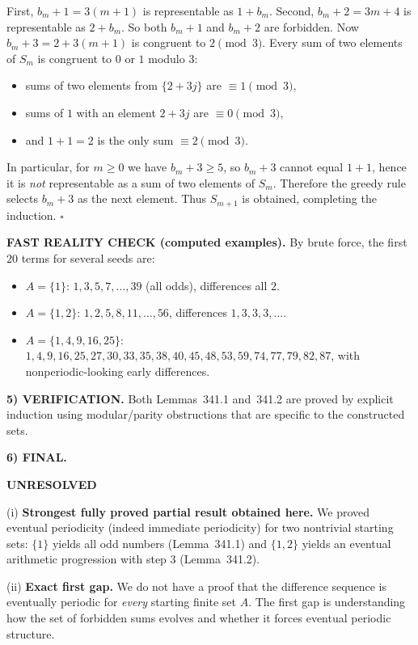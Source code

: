 First, $b_m+1=3(m+1)$ is representable as $1+b_m$.
Second, $b_m+2=3m+4$ is representable as $2+b_m$.
So both $b_m+1$ and $b_m+2$ are forbidden.
Now $b_m+3=2+3(m+1)$ is congruent to $2\pmod 3$.
Every sum of two elements of $S_m$ is congruent to $0$ or $1$ modulo $3$:
\begin{itemize}
\item sums of two elements from $\{2+3j\}$ are $\equiv 1\pmod 3$,
\item sums of $1$ with an element $2+3j$ are $\equiv 0\pmod 3$,
\item and $1+1=2$ is the only sum $\equiv 2\pmod 3$.
\end{itemize}
In particular, for $m\ge 0$ we have $b_m+3\ge 5$, so $b_m+3$ cannot equal $1+1$, hence it is \emph{not} representable as a sum of two elements of $S_m$.
Therefore the greedy rule selects $b_m+3$ as the next element.
Thus $S_{m+1}$ is obtained, completing the induction.
\hfill$\square$

\medskip
\noindent\textbf{FAST REALITY CHECK (computed examples).}
By brute force, the first $20$ terms for several seeds are:
\begin{itemize}
\item $A=\{1\}$: $1,3,5,7,\dots,39$ (all odds), differences all $2$.
\item $A=\{1,2\}$: $1,2,5,8,11,\dots,56$, differences $1,3,3,3,\dots$.
\item $A=\{1,4,9,16,25\}$: $1,4,9,16,25,27,30,33,35,38,40,45,48,53,59,74,77,79,82,87$, with nonperiodic-looking early differences.
\end{itemize}

\medskip
\noindent\textbf{5) VERIFICATION.}
Both Lemmas~341.1 and~341.2 are proved by explicit induction using modular/parity obstructions that are specific to the constructed sets.

\medskip
\noindent\textbf{6) FINAL.}

\noindent\textbf{UNRESOLVED}

\smallskip
\noindent (i) \textbf{Strongest fully proved partial result obtained here.}
We proved eventual periodicity (indeed immediate periodicity) for two nontrivial starting sets: $\{1\}$ yields all odd numbers (Lemma~341.1) and $\{1,2\}$ yields an eventual arithmetic progression with step $3$ (Lemma~341.2).

\smallskip
\noindent (ii) \textbf{Exact first gap.}
We do not have a proof that the difference sequence is eventually periodic for \emph{every} starting finite set $A$. The first gap is understanding how the set of forbidden sums evolves and whether it forces eventual periodic structure.

